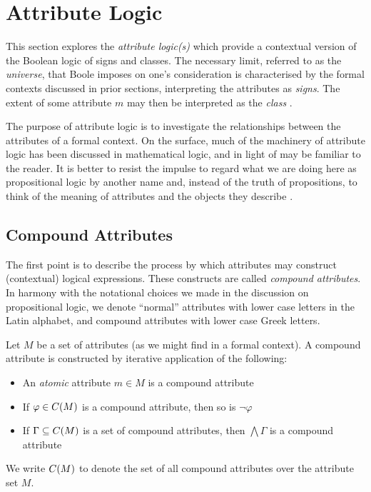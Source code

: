 \section{Attribute Logic}
\label{section:attribute-logic}

This section explores the \textit{attribute logic(s)}
\cite{ganter1999contextual,ganter2025language} which provide a contextual
version of the Boolean logic of signs and classes. The necessary limit, referred
to as the \textit{universe}, that Boole imposes on one's consideration is
characterised by the formal contexts discussed in prior sections, interpreting the
attributes as \textit{signs}. The extent of some attribute $m$ may then be interpreted
as the \textit{class} \cite{Wille2000}.

The purpose of attribute logic is to investigate the relationships between the
attributes of a formal context. On the surface, much of the machinery of
attribute logic has been discussed in mathematical logic, and in light of 
may be familiar to the reader. It is better to resist the impulse to regard what
we are doing here as propositional logic by another name and, instead of the truth
of propositions, to think of the meaning of attributes and the objects they
describe \cite{ganter2025language}.

\subsection{Compound Attributes}
\label{subsection:compound-attributes}

The first point is to describe the process by which attributes may construct (contextual)
logical expressions. These constructs are called \textit{compound attributes}.
In harmony with the notational choices we made in the discussion on
propositional logic, we denote ``normal'' attributes with lower case letters in the
Latin alphabet, and compound attributes with lower case Greek letters.

\begin{definition}
	\label{definition:compound-attributes} 

	Let $M$ be a set of attributes (as we might find in a formal context). A compound
	attribute is constructed by iterative application of the following: 
	\begin{itemize}[itemsep=-0em]
		\item An \textit{atomic} attribute $m\in M$ is a compound attribute

		\item If $\varphi \in C(M)$ is a compound attribute, then so is
		      $\neg \varphi$

		\item If $\Gamma \subseteq C(M)$ is a set of compound attributes, then
		      $\bigwedge \Gamma$ is a compound attribute
	\end{itemize}
	We write $C(M)$ to denote the set of all compound attributes over the attribute
	set $M$.
\end{definition}

